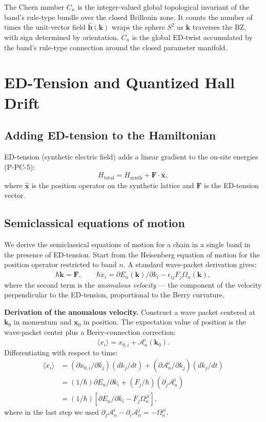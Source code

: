 \documentclass[11pt,a4paper]{article}
\begin{document}
The Chern number $C_n$ is the integer-valued global topological invariant of the band's rule-type bundle over the closed Brillouin zone. It counts the number of times the unit-vector field $\hat{\mathbf{h}}(\mathbf{k})$ wraps the sphere $S^2$ as $\mathbf{k}$ traverses the BZ, with sign determined by orientation. $C_n$ is the global ED-twist accumulated by the band's rule-type connection around the closed parameter manifold.

\section{ED-Tension and Quantized Hall Drift}

\subsection{Adding ED-tension to the Hamiltonian}

ED-tension (synthetic electric field) adds a linear gradient to the on-site energies (P-PC-5):
\[
H_{\mathrm{total}} = H_{\mathrm{synth}} + \mathbf{F}\cdot\hat{\mathbf{x}},
\]
where $\hat{\mathbf{x}}$ is the position operator on the synthetic lattice and $\mathbf{F}$ is the ED-tension vector.

\subsection{Semiclassical equations of motion}

We derive the semiclassical equations of motion for a chain in a single band in the presence of ED-tension. Start from the Heisenberg equation of motion for the position operator restricted to band $n$. A standard wave-packet derivation gives:
\[
\hbar\dot{\mathbf{k}} = \mathbf{F}, \qquad \hbar\dot x_i = \partial E_n(\mathbf{k})/\partial k_i - \epsilon_{ij} F_j\Omega_n(\mathbf{k}),
\]
where the second term is the \emph{anomalous velocity} --- the component of the velocity perpendicular to the ED-tension, proportional to the Berry curvature.

\textbf{Derivation of the anomalous velocity.} Construct a wave packet centered at $\mathbf{k}_0$ in momentum and $\mathbf{x}_0$ in position. The expectation value of position is the wave-packet center plus a Berry-connection correction:
\[
\langle x_i\rangle = x_{0,i} + \mathcal{A}_n^i(\mathbf{k}_0).
\]
Differentiating with respect to time:
\begin{align*}
\langle\dot x_i\rangle &= (\partial x_{0,i}/\partial k_j)(dk_j/dt) + (\partial\mathcal{A}_n^i/\partial k_j)(dk_j/dt) \\
&= (1/\hbar)\partial E_n/\partial k_i + (F_j/\hbar)(\partial_j\mathcal{A}_n^i) \\
&= (1/\hbar)[\partial E_n/\partial k_i - F_j\Omega_n^{ji}],
\end{align*}
where in the last step we used $\partial_j\mathcal{A}_n^i - \partial_i\mathcal{A}_n^j = -\Omega_n^{ji}$.
\end{document}
